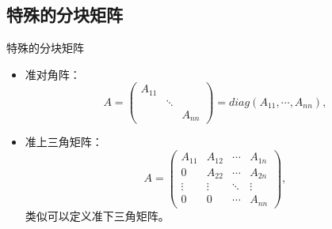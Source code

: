 
\subsection{特殊的分块矩阵}


\begin{frame}

\begin{block}{特殊的分块矩阵}
\begin{itemize}
\item 准对角阵：
\[A = \begin{pmatrix} A_{11} & & \\ & \ddots & \\ & & A_{nn} \end{pmatrix} = diag(A_{11},\cdots,A_{nn}),\]
\item 准上三角矩阵：
\[A = \begin{pmatrix} A_{11} & A_{12} & \cdots & A_{1n} \\ 0 & A_{22} & \cdots & A_{2n} \\ \vdots & \vdots & \ddots & \vdots \\ 0 & 0 & \cdots & A_{nn} \end{pmatrix},\]
类似可以定义准下三角矩阵。
\end{itemize}
\end{block}

\end{frame}



